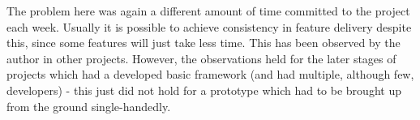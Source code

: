 The problem here was again a different amount of time committed to the project each week. Usually it is possible to achieve consistency in feature delivery despite this, since some features will just take less time. This has been observed by the author in other projects. However, the observations held for the later stages of projects which had a developed basic framework (and had multiple, although few, developers) - this just did not hold for a prototype which had to be brought up from the ground single-handedly.

% 
% 



